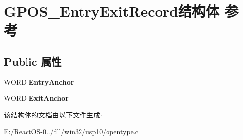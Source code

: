 \hypertarget{struct_g_p_o_s___entry_exit_record}{}\section{G\+P\+O\+S\+\_\+\+Entry\+Exit\+Record结构体 参考}
\label{struct_g_p_o_s___entry_exit_record}
\subsection*{Public 属性}
\begin{DoxyCompactItemize}
\item 
\mbox{\label{struct_g_p_o_s___entry_exit_record_ad98849e263a36b4def2d7b1bf1dbdafb}} 
W\+O\+RD {\bfseries Entry\+Anchor}
\item 
\mbox{\label{struct_g_p_o_s___entry_exit_record_ad560896b1ce7c547147d826cbe4d4ce3}} 
W\+O\+RD {\bfseries Exit\+Anchor}
\end{DoxyCompactItemize}


该结构体的文档由以下文件生成\+:\begin{DoxyCompactItemize}
\item 
E\+:/\+React\+O\+S-\/0../dll/win32/usp10/opentype.\+c\end{DoxyCompactItemize}

